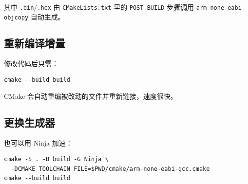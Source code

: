 其中 \texttt{.bin}/\texttt{.hex} 由 \texttt{CMakeLists.txt} 里的
\texttt{POST\_BUILD} 步骤调用 \texttt{arm-none-eabi-objcopy} 自动生成。

\subsection{重新编译增量}

修改代码后只需：

\begin{lstlisting}[style=bash]
cmake --build build
\end{lstlisting}

CMake 会自动重编被改动的文件并重新链接，速度很快。

\subsection{更换生成器}

也可以用 Ninja 加速：

\begin{lstlisting}[style=bash]
cmake -S . -B build -G Ninja \
  -DCMAKE_TOOLCHAIN_FILE=$PWD/cmake/arm-none-eabi-gcc.cmake
cmake --build build
\end{lstlisting}
